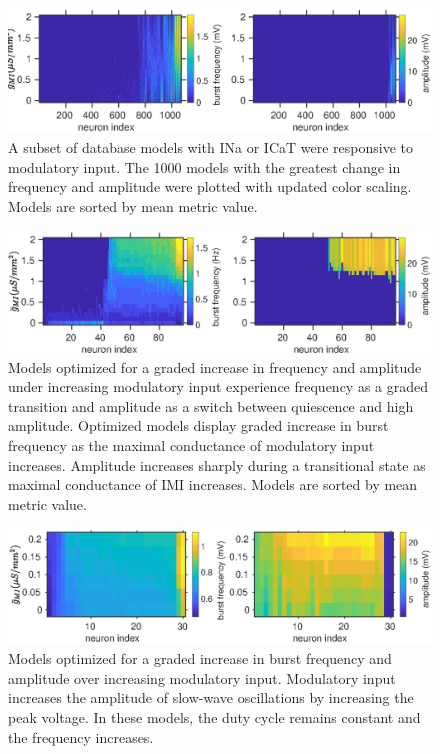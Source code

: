 \begin{figure}[h]
	\centering
	\includegraphics[width=1.0\linewidth]{gfx/prinz-models/prinz_excised}
	\caption[Responsive database models with modulatory input]{A subset of database models with \acs{INa} or \acs{ICaT} were responsive to modulatory input. The 1000 models with the greatest change in frequency and amplitude were plotted with updated color scaling. Models are sorted by mean metric value.}
	\label{fig:prinzburstingmodelsnavcatexcisedswensen}
\end{figure}

\begin{figure}
	\centering
	\includegraphics[width=1.0\linewidth]{gfx/prinz-models/prinz_optimized}
	\caption[Optimized database models increase in frequency and amplitude]{Models optimized for a graded increase in frequency and amplitude under increasing modulatory input experience frequency as a graded transition and amplitude as a switch between quiescence and high amplitude. Optimized models display graded increase in burst frequency as the maximal conductance of modulatory input increases. Amplitude increases sharply during a transitional state as maximal conductance of \acs{IMI} increases. Models are sorted by mean metric value.}
	\label{fig:figprinzburstingttxcatnoscgmiswensenexprosim3}
\end{figure}

\begin{figure}
	\centering
	\includegraphics[width=1.0\linewidth]{gfx/prinz-models/plot_optim_AB_graded}
	\caption[Optimized database models smoothly increase in frequency and amplitude]{Models optimized for a graded increase in burst frequency and amplitude over increasing modulatory input. Modulatory input increases the amplitude of slow-wave oscillations by increasing the peak voltage. In these models, the duty cycle remains constant and the frequency increases.}
	\label{fig:plotoptimabgraded}
\end{figure}

